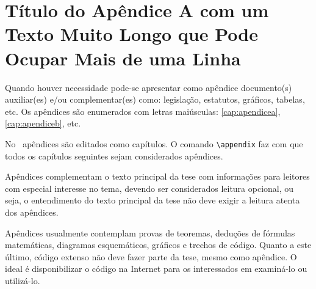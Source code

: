 
\chapter{Título do Apêndice A com um Texto Muito Longo que Pode Ocupar Mais de uma Linha}\label{cap:apendicea}

Quando houver necessidade pode-se apresentar como apêndice documento(s) auxiliar(es) e/ou complementar(es) como: legislação, estatutos, gráficos, tabelas, etc. Os apêndices são enumerados com letras maiúsculas: \autoref{cap:apendicea}, \autoref{cap:apendiceb}, etc.

No \latex\ apêndices são editados como capítulos. O comando \verb|\appendix| faz com que todos os capítulos seguintes sejam considerados apêndices.

Apêndices complementam o texto principal da tese com informações para leitores com especial interesse no tema, devendo ser considerados leitura opcional, ou seja, o entendimento do texto principal da tese não deve exigir a leitura atenta dos apêndices.

Apêndices usualmente contemplam provas de teoremas, deduções de fórmulas matemáticas, diagramas esquemáticos, gráficos e trechos de código. Quanto a este último, código extenso não deve fazer parte da tese, mesmo como apêndice. O ideal é disponibilizar o código na Internet para os interessados em examiná-lo ou utilizá-lo.




